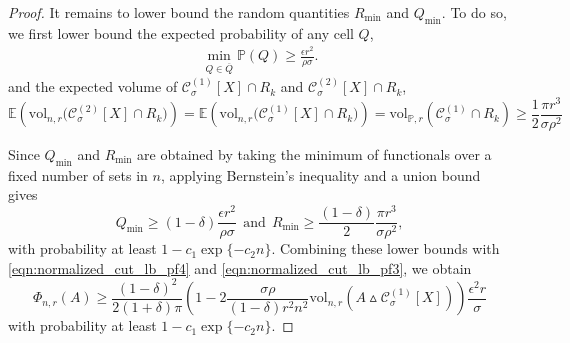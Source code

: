 \documentclass[11pt,twoside]{article}
\newcommand{\vol}{\mathrm{vol}}
\newcommand{\1}{\mathbf{1}}
\newcommand{\Xbf}{X}             %
\newcommand{\Pbb}{\mathbb{P}}
\begin{document}
\begin{proof}
	It remains to lower bound the random quantities $R_{\min}$ and $Q_{\min}$.
	To do so, we first lower bound the expected probability of any cell $Q$,
	\begin{align*}
	\min_{Q \in \overline{Q}} \Pbb(Q) \geq \frac{\epsilon r^2}{\rho \sigma}.
	\end{align*}
	and the expected volume of $\mathcal{C}_{\sigma}^{(1)}[\Xbf] \cap R_k$ and $\mathcal{C}_{\sigma}^{(2)}[\Xbf] \cap R_k$,
	\begin{equation*}
	\mathbb{E}(\vol_{n,r}\bigl(\mathcal{C}_{\sigma}^{(2)}[\Xbf] \cap R_k\bigr)) = \mathbb{E}(\vol_{n,r}\bigl(\mathcal{C}_{\sigma}^{(1)}[\Xbf] \cap R_k\bigr)) = \vol_{\Pbb,r}(\mathcal{C}_{\sigma}^{(1)} \cap R_k) \geq \frac{1}{2} \frac{\pi r^3}{\sigma \rho^2}
	\end{equation*}
	
	Since $Q_{\min}$ and $R_{\min}$ are obtained by taking the minimum of functionals over a fixed number of sets in $n$, applying Bernstein's inequality and a union bound gives
	\begin{equation*}
	Q_{\min} \geq (1 - \delta)\frac{\epsilon r^2}{\rho \sigma} ~~\textrm{and}~~ R_{\min} \geq \frac{(1 - \delta)}{2}\frac{\pi r^3}{\sigma \rho^2 },
	\end{equation*}
	with probability at least $1 - c_1 \exp\{-c_2 n\}$. Combining these lower bounds with \eqref{eqn:normalized_cut_lb_pf4} and \eqref{eqn:normalized_cut_lb_pf3}, we obtain
	\begin{equation*}	
	\Phi_{n,r}(A) \geq \frac{(1 - \delta)^2}{2(1 + \delta)\pi} \left(1 - 2 \frac{\sigma \rho}{(1 - \delta) r^2 n^2} \vol_{n,r}(A \vartriangle \mathcal{C}_{\sigma}^{(1)}[\Xbf]) \right) \frac{\epsilon^2 r}{\sigma}
	\end{equation*}
	with probability at least $1 - c_1 \exp\{-c_2 n\}$.
\end{proof}
\end{document}
